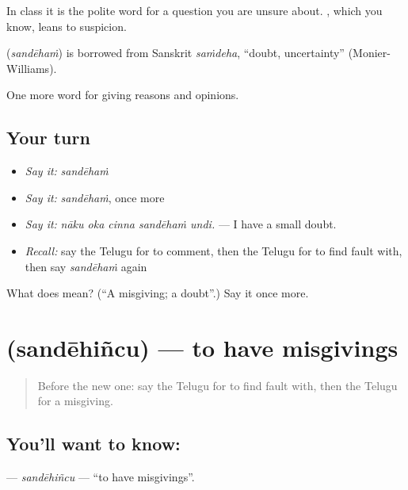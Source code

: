 In class it is the polite word for a question you are unsure about. , which you know, leans to suspicion.

\begin{cousinweb}
\textbf{} (\emph{sandēhaṁ}) is borrowed from Sanskrit \emph{saṁdeha}, \textquotedblleft{}doubt, uncertainty\textquotedblright{} (Monier-Williams).
\end{cousinweb}

\begin{grammarlens}[title={What you've built}]
One more word for giving reasons and opinions.
\end{grammarlens}

\subsection*{Your turn}
\begin{itemize}
\raggedright
  \item \emph{Say it:} \emph{sandēhaṁ}
  \item \emph{Say it:} \emph{sandēhaṁ}, once more
  \item \emph{Say it:} \emph{nāku oka cinna sandēhaṁ undi.} — I have a small doubt.
  \item \emph{Recall:} say the Telugu for to comment, then the Telugu for to find fault with, then say \emph{sandēhaṁ} again
\end{itemize}

\begin{tcolorbox}[breakable,colback=teal!4,colframe=teal!35!black,title={Before you move on}]
What does  mean? (\textquotedblleft{}A misgiving; a doubt\textquotedblright{}.) Say it once more.
\end{tcolorbox}
\section[\texorpdfstring{\te{సందేహించు} (sandēhiñcu)}{సందేహించు (sandēhiñcu)}]{ (sandēhiñcu) — to have misgivings}

\label{lesson:TE-C388-sandehincu}



\begin{quote}
Before the new one: say the Telugu for to find fault with, then the Telugu for a misgiving.
\end{quote}

\subsection*{You'll want to know: }
\textbf{} — \emph{sandēhiñcu} — \textquotedblleft{}to have misgivings\textquotedblright{}.

